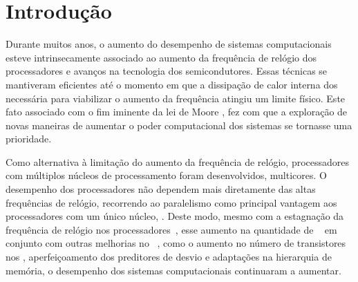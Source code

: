 \glsresetall

\chapter{Introdução}
\label{chap.intro}

Durante muitos anos, o aumento do desempenho de sistemas computacionais esteve intrinsecamente associado ao aumento da frequência de relógio dos processadores e avanços na tecnologia dos semicondutores. Essas técnicas se mantiveram eficientes até o momento em que a dissipação de calor interna dos \chips necessária para viabilizar o aumento da frequência atingiu um limite físico. Este fato associado com o fim iminente da lei de Moore \cite{moore:1965}, fez com que a exploração de novas maneiras de aumentar o poder computacional dos sistemas se tornasse uma prioridade.

Como alternativa à limitação do aumento da frequência de relógio, processadores com múltiplos núcleos de processamento foram desenvolvidos, \aka multicores. O desempenho dos processadores \multicore não dependem mais diretamente das altas frequências de relógio, recorrendo ao paralelismo como principal vantagem aos processadores com um único núcleo, \aka \singlecores. Deste modo, mesmo com a estagnação da frequência de relógio nos processadores~\cite{amrouch2018negative}, esse aumento na quantidade de \cores~\cite{gepner2006multi} em conjunto com outras melhorias no \hardware~\cite{fuller2011computing}, como o aumento no número de transistores nos \chips, aperfeiçoamento dos preditores de desvio e adaptações na hierarquia de memória, o desempenho dos sistemas computacionais continuaram a aumentar.

